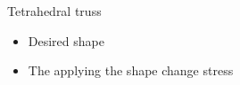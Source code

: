 \documentclass{beamer}
\begin{document}
\begin{frame}{Tetrahedral truss}
\begin{itemize}
\item Desired shape
\begin{figure}
\end{figure}

\item The applying the shape change stress
\begin{figure}
\end{figure}
\end{itemize}
\end{frame}
\end{document}
